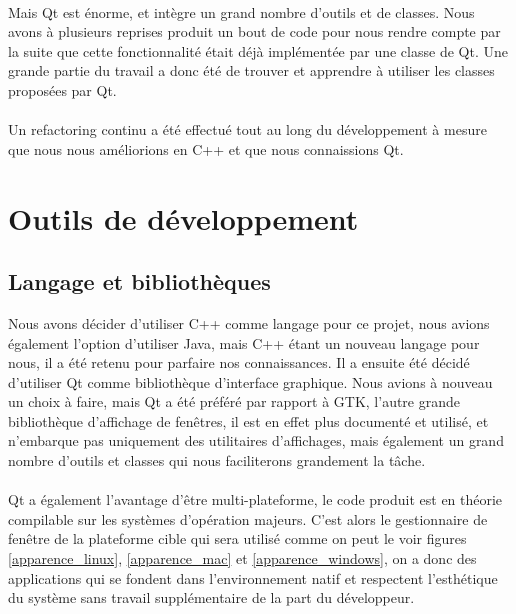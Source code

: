 \paragraph{}
Mais Qt est énorme, et intègre un grand nombre d'outils et de classes. Nous avons à plusieurs reprises produit un bout de code pour nous rendre compte par la suite que cette fonctionnalité était déjà implémentée par une classe de Qt. Une grande partie du travail a donc été de trouver et apprendre à utiliser les classes proposées par Qt.
\paragraph{}
Un refactoring continu a été effectué tout au long du développement à mesure que nous nous améliorions en C++ et que nous connaissions Qt.

\section{Outils de développement}

\subsection{Langage et bibliothèques}

Nous avons décider d'utiliser C++ comme langage pour ce projet, nous avions également l'option d'utiliser Java, mais C++ étant un nouveau langage pour nous, il a été retenu pour parfaire nos connaissances. Il a ensuite été décidé d'utiliser Qt comme bibliothèque d'interface graphique. Nous avions à nouveau un choix à faire, mais Qt a été préféré par rapport à GTK, l'autre grande bibliothèque d'affichage de fenêtres, il est en effet plus documenté et utilisé, et n'embarque pas uniquement des utilitaires d'affichages, mais également un grand nombre d'outils et classes qui nous faciliterons grandement la tâche.
\paragraph{}
Qt a également l'avantage d'être multi-plateforme, le code produit est en théorie compilable sur les systèmes d'opération majeurs. C'est alors le gestionnaire de fenêtre de la plateforme cible qui sera utilisé comme on peut le voir figures \ref{apparence_linux}, \ref{apparence_mac} et \ref{apparence_windows}, on a donc des applications qui se fondent dans l'environnement natif et respectent l'esthétique du système sans travail supplémentaire de la part du développeur.

